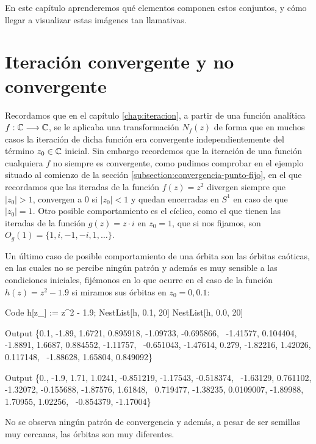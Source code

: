 En este capítulo aprenderemos qué elementos componen estos conjuntos, y cómo llegar a visualizar estas imágenes tan llamativas.

\section{Iteración convergente y no convergente}

Recordamos que en el capítulo \ref{chap:iteracion}, a partir de una función analítica $f:\mathbb{C}\longrightarrow\mathbb{C}$, se le aplicaba una transformación $N_f(z)$ de forma que en muchos casos la iteración de dicha función era convergente independientemente del término $z_0\in\mathbb{C}$ inicial. Sin embargo recordemos que la iteración de una función cualquiera $f$ no siempre es convergente, como pudimos comprobar en el ejemplo situado al comienzo de la sección \ref{subsection:convergencia-punto-fijo}, en el que recordamos que las iteradas de la función $f(z)=z^2$ divergen siempre que $|z_0|>1$, convergen a $0$ si $|z_0|<1$ y quedan encerradas en $S^1$ en caso de que $|z_0|=1$. Otro posible comportamiento es el cíclico, como el que tienen las iteradas de la función $g(z)=z\cdot i$ en $z_0=1$, que si nos fijamos, son $O_g(1)=\{1,i,-1,-i,1,\dots\}$. 

Un último caso de posible comportamiento de una órbita son las órbitas caóticas, en las cuales no se percibe ningún patrón y además es muy sensible a las condiciones iniciales, fijémonos en lo que ocurre en el caso de la función $h(z)=z^2-1.9$ si miramos sus órbitas en $z_0=0,0.1$:

\begin{mmaCell}{Code}
  h[z_] := z^2 - 1.9;
  NestList[h, 0.1, 20]
  NestList[h, 0.0, 20]
\end{mmaCell}
\begin{mmaCell}{Output}
  \{0.1, -1.89, 1.6721, 0.895918, -1.09733, -0.695866,  \
  -1.41577, 0.104404, -1.8891, 1.6687, 0.884552, -1.11757, \
  -0.651043, -1.47614, 0.279, -1.82216, 1.42026, 0.117148, \
  -1.88628, 1.65804, 0.849092\}
\end{mmaCell}
\begin{mmaCell}{Output}
  \{0., -1.9, 1.71, 1.0241, -0.851219, -1.17543, -0.518374, \
  -1.63129, 0.761102, -1.32072, -0.155688, -1.87576, 1.61848, \
  0.719477, -1.38235, 0.0109007, -1.89988, 1.70955, 1.02256, \
  -0.854379, -1.17004\}
  \end{mmaCell}

No se observa ningún patrón de convergencia y además, a pesar de ser semillas muy cercanas, las órbitas son muy diferentes.

